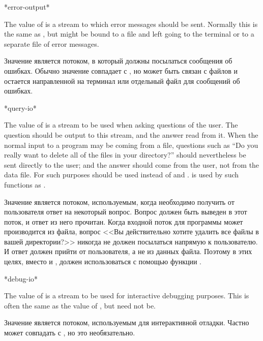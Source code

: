 \begin{defun}[Variable]
*error-output*

The value of  is a stream to which error messages
should be sent.  Normally this is the same as ,
but  might be bound to a file and 
left going to the terminal or to a separate file of error messages.

Значение  является потоком, в который должны посылаться
сообщения об ошибках. Обычно значение совпадает с , но
 может быть связан с файлов и 
остается направленной на терминал или отдельный файл для сообщений об ошибках.
\end{defun}

\begin{defun}[Variable]
*query-io*

The value of  is a stream to be used when
asking questions of the user.  The question should be output to this
stream, and the answer read from it.  When
the normal input to a program may be coming from a file, questions such
as ``Do you really want to delete all of the files in your directory?'' should
nevertheless
be sent directly to the user; and the answer should come from the user,
not from the data file.  For such purposes  should be
used instead of  and .
 is used by such functions
as .

Значение  является потоком, используемым, когда необходимо
получить от пользователя ответ на некоторый вопрос. Вопрос должен быть выведен в
этот поток, и ответ из него прочитан. Когда входной поток для программы может
производится из файла, вопрос <<Вы действительно хотите удалить все файлы в
вашей директории?>> никогда не должен посылаться напрямую к пользователю. И
ответ должен прийти от пользователя, а не из данных файла.
Поэтому в этих целях, вместо  и ,
должен использоваться  с помощью функции .
\end{defun}

\begin{defun}[Variable]
*debug-io*

The value of  is a stream to be used for interactive
debugging purposes.  This is often the same as the value of ,
but need not be.

Значение  является потоком, используемым для интерактивной
отладки. Частно может совпадать с , но это необязательно.
\end{defun}

